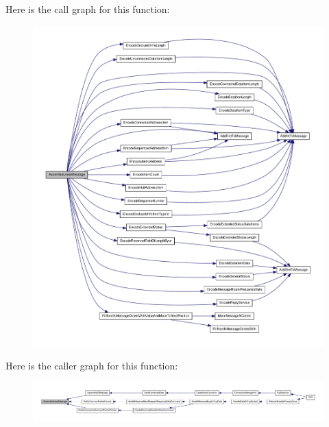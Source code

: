 \-Here is the call graph for this function\-:
\nopagebreak
\begin{figure}[H]
\begin{center}
\leavevmode
\includegraphics[width=350pt]{d4/d91/group__ENCAP_gaa81c027561d86d2589b8002b36b88392_cgraph}
\end{center}
\end{figure}




\-Here is the caller graph for this function\-:
\nopagebreak
\begin{figure}[H]
\begin{center}
\leavevmode
\includegraphics[width=350pt]{d4/d91/group__ENCAP_gaa81c027561d86d2589b8002b36b88392_icgraph}
\end{center}
\end{figure}


